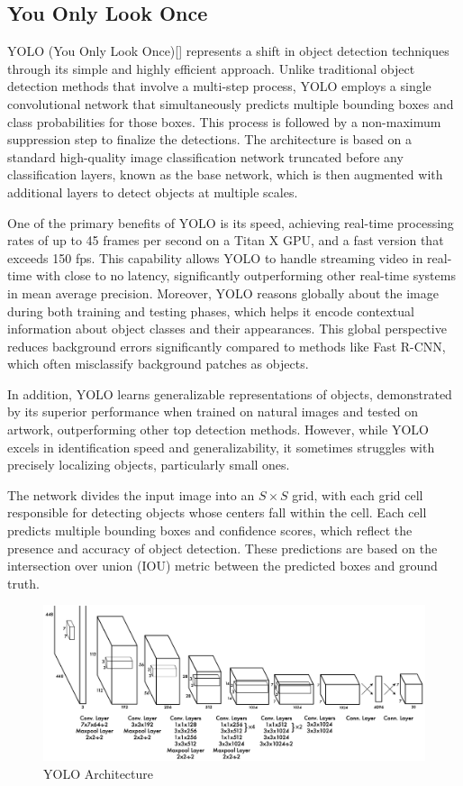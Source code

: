 \subsection{You Only Look Once}

YOLO (You Only Look Once)[] represents a shift in object detection techniques through its simple and highly efficient approach. Unlike traditional 
object detection methods that involve a multi-step process, YOLO employs a single convolutional network that simultaneously predicts multiple bounding boxes 
and class probabilities for those boxes. This process is followed by a non-maximum suppression step to finalize the detections. The architecture is based on a 
standard high-quality image classification network truncated before any classification layers, known as the base network, which is then augmented with additional 
layers to detect objects at multiple scales.

One of the primary benefits of YOLO is its speed, achieving real-time processing rates of up to 45 frames per second on a Titan X GPU, and a fast 
version that exceeds 150 fps. This capability allows YOLO to handle streaming video in real-time with close to no latency, significantly outperforming other 
real-time systems in mean average precision. Moreover, YOLO reasons globally about the image during both training and testing phases, which helps it encode 
contextual information about object classes and their appearances. This global perspective reduces background errors significantly compared to methods like 
Fast R-CNN, which often misclassify background patches as objects.

In addition, YOLO learns generalizable representations of objects, demonstrated by its superior performance when trained on natural images and tested on 
artwork, outperforming other top detection methods. However, while YOLO excels in identification speed and generalizability, it sometimes struggles with 
precisely localizing objects, particularly small ones. 


\newpage
The network divides the input image into an \(S \times S\) grid, with each grid cell responsible for 
detecting objects whose centers fall within the cell. Each cell predicts multiple bounding boxes and confidence scores, which reflect the presence and 
accuracy of object detection. These predictions are based on the intersection over union (IOU) metric between the predicted boxes and ground truth.

\begin{figure}[h!]
    \centering
    \includegraphics[scale=0.55]{Figures/yolo.jpg}
    \caption{YOLO Architecture}
    \label{fig:yolo}
\end{figure}


